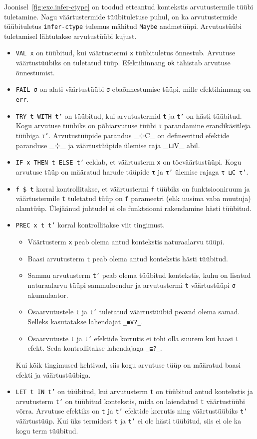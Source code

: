 \documentclass[a4paper,12pt]{article}
\begin{document}
Joonisel~\ref{fig:exc.infer-ctype} on toodud etteantud kontekstis arvutustermile tüübi tuletamine.
Nagu väärtustermide tüübituletuse puhul, on ka arvutustermide tüübituletus {\tt infer-ctype} tulemus mähitud {\tt Maybe} andmetüüpi.
Arvutustüübi tuletamisel lähtutakse arvutustüübi kujust.
\begin{itemize}
\item {\tt VAL x} on tüübitud, kui väärtustermi {\tt x} tüübituletus õnnestub. Arvutuse väärtustüübiks on tuletatud tüüp. Efektihinnang {\tt ok} tähistab arvutuse õnnestumist. 
\item {\tt FAIL σ} on alati väärtustüübi {\tt σ} ebaõnnestumise tüüpi, mille efektihinnang on {\tt err}.
\item {\tt TRY t WITH t'} on tüübitud, kui arvutustermid {\tt t} ja {\tt t'} on hästi tüübitud. Kogu arvutuse tüübiks on põhiarvutuse tüübi {\tt τ} parandamine erandikäsitleja tüübiga {\tt τ'}. Arvutustüüpide parandus _⊹C_ on defineeritud efektide paranduse _⊹_ ja väärtustüüpide ülemise raja _⊔V_ abil.
\item {\tt IF x THEN t ELSE t'} eeldab, et väärtusterm {\tt x} on tõeväärtustüüpi. Kogu arvutuse tüüp on määratud harude tüüpide {\tt τ} ja {\tt τ'} ülemise rajaga {\tt τ ⊔C τ'}.
\item {\tt f \$ t} korral kontrollitakse, et väärtustermi {\tt f} tüübiks on funktsiooniruum ja väärtustermile {\tt t} tuletatud tüüp on {\tt f} parameetri (ehk uusima vaba muutuja) alamtüüp. Ülejäänud juhtudel ei ole funktsiooni rakendamine hästi tüübitud.
\item {\tt PREC x t t'} korral kontrollitakse viit tingimust.
  \begin{itemize}
  \item Väärtusterm {\tt x} peab olema antud kontekstis naturaalarvu tüüpi.
  \item Baasi arvutusterm {\tt t} peab olema antud kontekstis hästi tüübitud.
  \item Sammu arvutusterm {\tt t'} peab olema tüübitud kontekstis, kuhu on lisatud naturaalarvu tüüpi sammuloendur ja arvutustermi {\tt t} väärtustüüpi {\tt σ} akumulaator.
  \item Osaarvutustele {\tt t} ja {\tt t'} tuletatud väärtustüübid peavad olema samad. Selleks kasutatakse lahendajat {\tt _≡V?_}.
  \item Osaarvutuste {\tt t} ja {\tt t'} efektide korrutis ei tohi olla suurem kui baasi {\tt t} efekt. Seda kontrollitakse lahendajaga {\tt _⊑?_}.
  \end{itemize}
  Kui kõik tingimused kehtivad, siis kogu arvutuse tüüp on määratud baasi efekti ja väärtustüübiga.
\item {\tt LET t IN t'} on tüübitud, kui arvutusterm {\tt t} on tüübitud antud kontekstis ja arvutusterm {\tt t'} on tüübitud kontekstis, mida on laiendatud {\tt t} väärtustüübi võrra. Arvutuse efektiks on {\tt t} ja {\tt t'} efektide korrutis ning väärtustüübiks {\tt t'} väärtustüüp. Kui üks termidest {\tt t} ja {\tt t'} ei ole hästi tüübitud, siis ei ole ka kogu term tüübitud.
\end{itemize}
\end{document}
